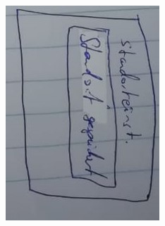 \documentclass[12pt]{article}
\theoremstyle{definition}
\begin{document}
\includegraphics[angle=90, scale=.8]{UseCase/StandortGespeichert.jpeg}\\\\
\end{document}
